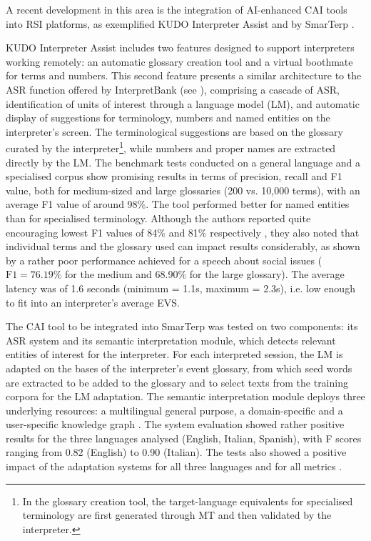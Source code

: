 \begin{sloppypar}
A recent development in this area is the integration of AI-enhanced CAI tools into RSI platforms, as exemplified KUDO Interpreter Assist \citep{fantinuoliKUDOInterpreterAssist2022} and by SmarTerp \citep{rodriguezSmarTerpCAISystem2021}.

KUDO Interpreter Assist includes two features designed to support interpreters working remotely: an automatic glossary creation tool and a virtual boothmate for terms and numbers. This second feature presents a similar architecture to the ASR function offered by InterpretBank (see ), comprising a cascade of ASR, identification of units of interest through a language model (LM), and automatic display of suggestions for terminology, numbers and named entities on the interpreter's screen. The terminological suggestions are based on the glossary curated by the interpreter\footnote{In the glossary creation tool, the target-language equivalents for specialised terminology are first generated through MT and then validated by the interpreter.}, while numbers and proper names are extracted directly by the LM. The benchmark tests conducted on a general language and a specialised corpus show promising results in terms of precision, recall and F1 value, both for medium-sized and large glossaries (200 vs. 10,000 terms), with an average F1 value of around 98\%. The tool performed better for named entities than for specialised terminology. Although the authors reported quite encouraging lowest F1 values of 84\% and 81\% respectively \citep[7]{fantinuoliKUDOInterpreterAssist2022}, they also noted that individual terms and the glossary used can impact results considerably, as shown by a rather poor performance achieved for a speech about social issues ($\text{F1}=76.19\%$ for the medium and 68.90\% for the large glossary). The average latency was of 1.6 seconds (minimum = 1.1s, maximum = 2.3s), i.e. low enough to fit into an interpreter's average EVS.
\end{sloppypar}

The CAI tool to be integrated into SmarTerp was tested on two components: its ASR system and its semantic interpretation module, which detects relevant entities of interest for the interpreter. For each interpreted session, the LM is adapted on the bases of the interpreter's event glossary, from which seed words are extracted to be added to the glossary and to select texts from the training corpora for the LM adaptation. The semantic interpretation module deploys three underlying resources: a multilingual general purpose, a domain-specific and a user-specific knowledge graph \citep[105]{rodriguezSmarTerpCAISystem2021}. The system evaluation showed rather positive results for the three languages analysed (English, Italian, Spanish), with F scores ranging from 0.82 (English) to 0.90 (Italian). The tests also showed a positive impact of the adaptation systems for all three languages and for all metrics \citep[108]{rodriguezSmarTerpCAISystem2021}.

